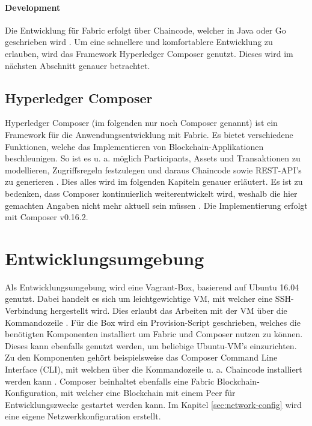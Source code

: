 \paragraph{Development}
Die Entwicklung für Fabric erfolgt über Chaincode, welcher in Java oder Go geschrieben wird \cite{HyperledgerFabricTeamSDKsHyperledgerFabric}. Um eine schnellere und komfortablere Entwicklung zu erlauben, wird das Framework Hyperledger Composer genutzt. Dieses wird im nächsten Abschnitt genauer betrachtet.


\subsection{Hyperledger Composer}
Hyperledger Composer (im folgenden nur noch Composer genannt) ist ein Framework für die Anwendungsentwicklung mit Fabric. Es bietet verschiedene Funktionen, welche das Implementieren von Blockchain-Applikationen beschleunigen. So ist es u. a. möglich Participants, Assets und Transaktionen zu modellieren, Zugriffsregeln festzulegen und daraus Chaincode sowie REST-API's zu generieren \cite{HyperledgerComposerTeamIntroductionHyperledgerComposer}. Dies alles wird im folgenden Kapiteln genauer erläutert. Es ist zu bedenken, dass Composer kontinuierlich weiterentwickelt wird, weshalb die hier gemachten Angaben nicht mehr aktuell sein müssen \cite{HyperledgerComposerTeamHyperledgerComposerReleases2018}. Die Implementierung erfolgt mit Composer v0.16.2.

\section{Entwicklungsumgebung}
Als Entwicklungsumgebung wird eine Vagrant-Box, basierend auf Ubuntu 16.04 genutzt. Dabei handelt es sich um leichtgewichtige VM, mit welcher eine SSH-Verbindung hergestellt wird. Dies erlaubt das Arbeiten mit der VM über die Kommandozeile \cite{VagrantTeamVagrantHashiCorp}. Für die Box wird ein Provision-Script geschrieben, welches die benötigten Komponenten installiert um Fabric und Composer nutzen zu können. Dieses kann ebenfalls genutzt werden, um beliebige Ubuntu-VM's einzurichten. Zu den Komponenten gehört beispielsweise das Composer Command Line Interface (CLI), mit welchen über die Kommandozeile u. a. Chaincode installiert werden kann \cite{HyperledgerComposerTeamDevelopmentEnvironmentHyperledger}. Composer beinhaltet ebenfalls eine Fabric Blockchain-Konfiguration, mit welcher eine Blockchain mit einem Peer für Entwicklungszwecke gestartet werden kann. Im Kapitel \ref{sec:network-config} wird eine eigene Netzwerkkonfiguration erstellt.

